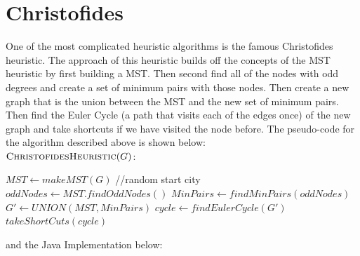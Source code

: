 \documentclass[midd]{thesis}
\newcommand{\tab}{\hspace*{2em}}
\begin{document}
\section{Christofides}
\tab One of the most complicated heuristic algorithms is the famous Christofides heuristic. The approach of this heuristic builds off the concepts of the MST heuristic by first building a MST. Then second find all of the nodes with odd degrees and create a set of minimum pairs with those nodes. Then create a new graph that is the union between the MST and the new set of minimum pairs. Then find the Euler Cycle (a path that visits each of the edges once) of the new graph and take shortcuts if we have visited the node before. The pseudo-code for the algorithm described above is shown below:\\
$\textnormal{\scshape ChristofidesHeuristic}(G)$:
\begin{codebox}
\li $MST \gets makeMST(G)$ //random start city
\li $oddNodes \gets MST.findOddNodes()$
\li $MinPairs \gets findMinPairs(oddNodes)$
\li $G' \gets UNION(MST,MinPairs)$
\li $cycle \gets findEulerCycle(G')$
\li\Return $takeShortCuts(cycle)$
\end{codebox}

and the Java Implementation below:\\
\end{document}
